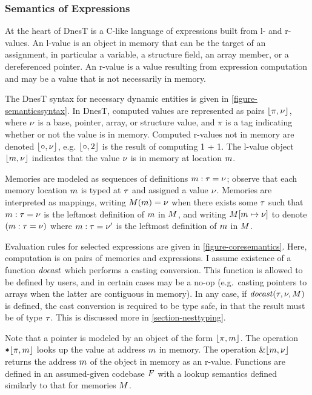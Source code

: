 \semanticssyntaxfig

\subsubsection{Semantics of Expressions}

At the heart of DnesT is a C-like language of expressions built from l- and r-values. An l-value
is an object in memory that can be the target of an assignment, in particular a variable, a
structure field, an array member, or a dereferenced pointer. An r-value is a value resulting
from expression computation and may be a value that is not necessarily in memory.

The DnesT syntax for necessary dynamic entities is given in \autoref{figure-semanticssyntax}. In
DnesT, computed values are represented as pairs $\lfloor \pi,{\nu} \rfloor$, where ${\nu}$ is a base,
pointer, array, or structure value, and $\pi$ is a tag indicating whether or not the value is in
memory. Computed r-values not in memory are denoted $\lfloor \circ,{\nu} \rfloor$, e.g. $\lfloor \circ,2 \rfloor$
is the result of computing 1 + 1. The l-value object $\lfloor m,{\nu} \rfloor$ indicates that the value
${\nu}$ is in memory at location $m$.

Memories are modeled as sequences of definitions $m : \tau = {\nu}$; observe that each memory
location $m$ is typed at $\tau$ and assigned a value ${\nu}$. Memories are interpreted as
mappings, writing $M(m) = {\nu}$ when there exists some $\tau$ such that $m : \tau = {\nu}$
is the leftmost definition of $m$ in $M$, and writing $M[m \mapsto {\nu}]$ to
denote $(m : \tau = {\nu})$ where $m : \tau = {\nu}'$ is the leftmost definition of $m$ in
$M$.

Evaluation rules for selected expressions are given in \autoref{figure-coresemantics}. Here,
computation is on pairs of memories and expressions. I assume existence of a function
$\mathit{docast}$ which performs a casting conversion. This function is allowed to be defined by
users, and in certain cases may be a no-op (e.g.~casting pointers to arrays when the latter are
contiguous in memory). In any case, if $\mathit{docast}(\tau,{\nu},M)$ is defined, the cast
conversion is required to be type safe, in that the result must be of type $\tau$. This is
discussed more in \autoref{section-nesttyping}.

\coresemanticsfig

Note that a pointer is modeled by an object of the form $\lfloor \pi,m \rfloor$. The operation
$\texttt{*}\lfloor \pi,m \rfloor$ looks up the value at address $m$ in memory. The operation
$\&\lfloor m,{\nu} \rfloor$ returns the address $m$ of the object in memory as an r-value. Functions
are defined in an assumed-given codebase $F$ with a lookup semantics defined similarly to
that for memories $M$.

